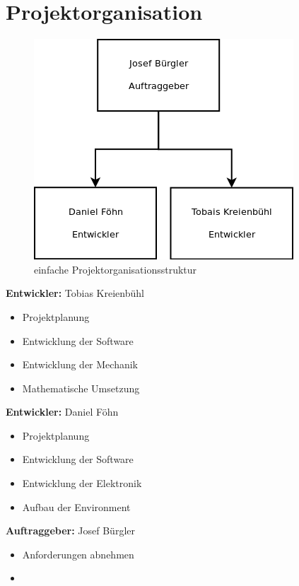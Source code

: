 \documentclass[a4paper, 10pt, fleqn]{article}
\begin{document}
	\section{Projektorganisation}
        \begin{figure}[H]
            \centering
            \includegraphics[width=.5\textwidth]{organisation.png}
            \caption{einfache Projektorganisationsstruktur}
        \end{figure}
		\textbf{Entwickler:} Tobias Kreienbühl
        \begin{itemize}
            \item Projektplanung
            \item Entwicklung der Software
            \item Entwicklung der Mechanik
            \item Mathematische Umsetzung
        \end{itemize}
        \vspace{.5cm}
        \textbf{Entwickler:} Daniel Föhn
        \begin{itemize}
            \item Projektplanung
            \item Entwicklung der Software
            \item Entwicklung der Elektronik
            \item Aufbau der Environment
        \end{itemize}
        \vspace{.5cm}
        \textbf{Auftraggeber:} Josef Bürgler
        \begin{itemize}
            \item Anforderungen abnehmen
            \item 
        \end{itemize}
    
    \clearpage
\end{document}
